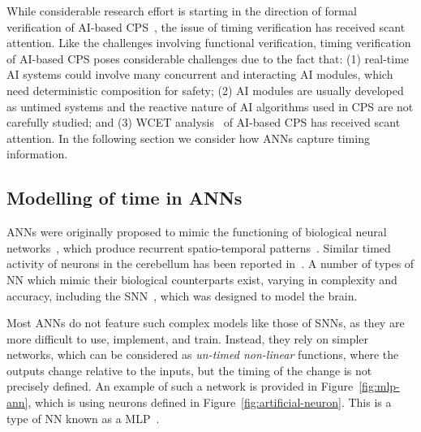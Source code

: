 While considerable research effort is starting in the direction of formal verification of \ac{AI}-based \ac{CPS}~\cite{seshia2016towards, russell2015},
 the issue of timing verification has received scant attention. 
Like the challenges involving functional verification, timing verification of AI-based  \ac{CPS} poses considerable 
challenges due to the fact that: (1) real-time \ac{AI} systems could involve many concurrent and interacting \ac{AI} modules, which need 
deterministic composition for safety; (2) \ac{AI} modules are usually developed as untimed systems and the reactive nature of 
AI algorithms used in CPS are not carefully studied; and (3) \acf{WCET} analysis~\cite{wilhelm2008worst} of \ac{AI}-based \ac{CPS} has received scant attention.
 In the following section we 
 consider how \acp{ANN} capture timing information.


\subsection{ Modelling of time in \acp{ANN}}
\label{ANN-review}

\acp{ANN} were originally proposed to mimic the functioning of  biological neural networks~\cite{kohonen1988introduction}, which produce recurrent spatio-temporal patterns~\cite{rolston2007precisely}. 
Similar timed activity of neurons in the cerebellum has been reported in~\cite{bullock1994neural, moore1989adaptively}. 
A number of types of \ac{NN} which mimic their biological counterparts exist, varying in complexity and accuracy, including the \ac{SNN}~\cite{izhikevich2003spiking,maass1997spiking}, which was designed to model the brain. %

Most \acp{ANN} do not feature such complex models like those of \acp{SNN}, as they are more difficult to use, implement, and train. 
Instead, they rely on simpler networks, which can be considered as \emph{un-timed non-linear} functions, 
where the outputs change relative to the inputs, but the timing of the change is not precisely defined. 
An example of such a network is provided in Figure~\ref{fig:mlp-ann}, which is using neurons defined in Figure~\ref{fig:artificial-neuron}. 
This is a type of \ac{NN} known as a \acf{MLP}~\cite{yegnanarayana1994artificial}.



